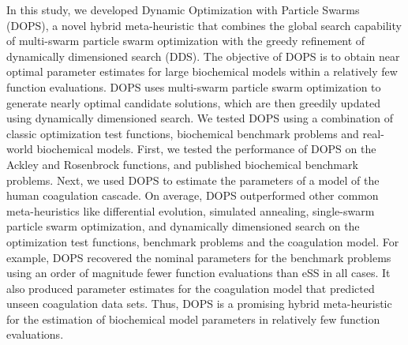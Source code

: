 \documentclass{bmcart}
\begin{document}

In this study, we developed Dynamic Optimization with Particle Swarms (DOPS), a novel hybrid meta-heuristic that combines the global search capability of multi-swarm particle swarm optimization with the greedy refinement of dynamically dimensioned search (DDS).
The objective of DOPS is to obtain near optimal parameter estimates for large biochemical models within a relatively few function evaluations.
DOPS uses multi-swarm particle swarm optimization to generate nearly optimal candidate solutions, which are then greedily updated using dynamically dimensioned search.
We tested DOPS using a combination of classic optimization test functions, biochemical benchmark problems and real-world biochemical models.
First, we tested the performance of DOPS on the Ackley and Rosenbrock functions, and published biochemical benchmark problems.
Next, we used DOPS to estimate the parameters of a model of the human coagulation cascade.
On average, DOPS outperformed other common meta-heuristics like differential evolution, simulated annealing, single-swarm particle swarm optimization, and dynamically dimensioned search on the optimization test functions, benchmark problems and the coagulation model. For example, DOPS recovered the nominal parameters for the benchmark problems using an order of magnitude fewer function evaluations than eSS in all cases.
It also produced parameter estimates for the coagulation model that predicted unseen coagulation data sets.
Thus, DOPS is a promising hybrid meta-heuristic for the estimation of biochemical model parameters in relatively few function evaluations.
\end{document}
